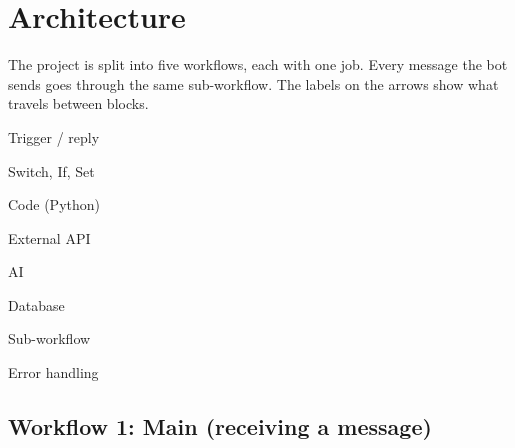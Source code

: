 \documentclass[10pt,a4paper]{article}
\newcommand{\legendtag}[2]{\colorbox{#1}{\strut\footnotesize #2}}
\begin{document}
\section{Architecture}

The project is split into five workflows, each with one job. Every message the bot sends goes through the same
sub-workflow. The labels on the arrows show what travels between blocks.

\smallskip
\legendtag{cTrig}{Trigger / reply} \legendtag{cLogic}{Switch, If, Set} \legendtag{cCode}{Code (Python)}
\legendtag{cApi}{External API} \legendtag{cAI}{AI} \legendtag{cDB}{Database} \legendtag{cSub}{Sub-workflow}
\legendtag{cErr}{Error handling}

\subsection{Workflow 1: Main (receiving a message)}
\end{document}
